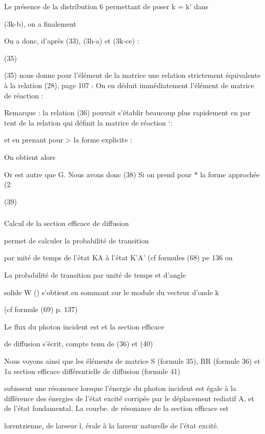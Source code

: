 Le présence de la distribution 6 permettant de poser k = k' dans

(3k-b), on a finalement


On a donc, d'après (33), (3h-a) et (3k-ce) :



(35) 

(35) nous donne pour l'élément de la matrice  une relation strictement
équivalente à la relation (28), page 107 :
On en déduit immédiatement l'élément de matrice de réaction :


Remarque : la relation (36) pouvait s'établir beaucoup plus rapidement en par
tent de la relation qui définit la matrice de réaction ‘:

et en prenant pour > la forme explicite :

On obtient alors

Or  est autre que G. Nous avons donc
(38)
Si on prend pour * la forme approchée (2%

(39)

\subsubsection{} Calcul de la section efficace de diffusion%

 permet de calculer la probabilité de transition

par mité de temps de l'état KA à l'état K'A' (cf formules (68) pe 136 ou

La probabilité de transition par unité de temps et d'angle

solide W () s'obtient en sommant sur le module du vecteur d'onde k

(cf formule (69) p. 137)

Le flux du photon incident est et la section efficace

de diffusion s'écrit, compte tenu de (36) et (40)

Nous voyons ainsi que les éléments de matrice S (formule 35),
BR (formule 36) et 1a section efficace différentielle de diffusion (formule 41)

subissent une résonence lorsque l'énergie du photon incident est égale à la
différence des énergies de l'état excité corripée par le déplacement rediatif
A, et de l'état fondamental. La courbe. de résonance de la section efficace est

lorentzienne, de larseur l, érale à la larseur naturelle de l'état excité.

